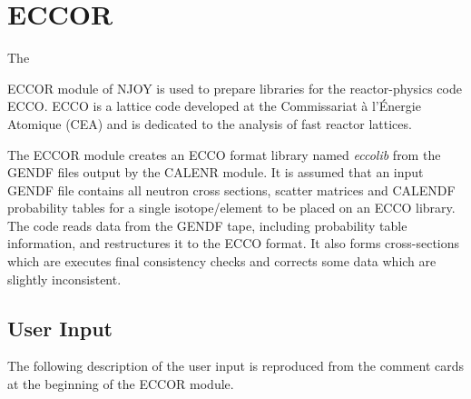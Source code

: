 \section{ECCOR}
\label{sECCOR}

\hypertarget{sECCORhy}{The}
ECCOR module of NJOY is used to prepare libraries for the
reactor-physics code ECCO\cite{ecco}. ECCO is a lattice code
developed at the Commissariat \`a l'\'Energie Atomique (CEA) and is dedicated
to the analysis of fast reactor lattices.

The ECCOR module creates an ECCO format library named {\sl eccolib} from the
GENDF files output by the CALENR module. It is assumed that an input GENDF file
contains all neutron cross sections, scatter matrices and CALENDF probability
tables for a single isotope/element to be placed on an ECCO library. The code
reads data from the GENDF tape, including probability table information, and
restructures it to the ECCO format. It also forms cross-sections which are
executes final consistency checks and corrects some data which are slightly
inconsistent\cite{eccolib}.

\subsection{User Input}
\label{ssECCOR_UserInp}

The following description of the user input is reproduced from
the comment cards at the beginning of the ECCOR module.

